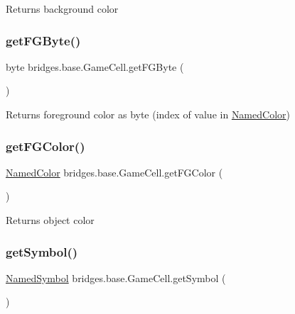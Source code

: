\begin{DoxyReturn}{Returns}
background color 
\end{DoxyReturn}
\mbox{\label{classbridges_1_1base_1_1_game_cell_ad1a05ce3e8ca8e148d867e6248023253}} 
\subsubsection{\texorpdfstring{getFGByte()}{getFGByte()}}
{\footnotesize\ttfamily byte bridges.\+base.\+Game\+Cell.\+get\+F\+G\+Byte (\begin{DoxyParamCaption}{ }\end{DoxyParamCaption})}

\begin{DoxyReturn}{Returns}
foreground color as byte (index of value in \mbox{\hyperlink{enumbridges_1_1base_1_1_named_color}{Named\+Color}}) 
\end{DoxyReturn}
\mbox{\label{classbridges_1_1base_1_1_game_cell_a9355404eb09017ca7ee3e90490e1d13b}} 
\subsubsection{\texorpdfstring{getFGColor()}{getFGColor()}}
{\footnotesize\ttfamily \mbox{\hyperlink{enumbridges_1_1base_1_1_named_color}{Named\+Color}} bridges.\+base.\+Game\+Cell.\+get\+F\+G\+Color (\begin{DoxyParamCaption}{ }\end{DoxyParamCaption})}

\begin{DoxyReturn}{Returns}
object color 
\end{DoxyReturn}
\mbox{\label{classbridges_1_1base_1_1_game_cell_a5c5ce5b363e442ac10c8588cbec77511}} 
\subsubsection{\texorpdfstring{getSymbol()}{getSymbol()}}
{\footnotesize\ttfamily \mbox{\hyperlink{enumbridges_1_1base_1_1_named_symbol}{Named\+Symbol}} bridges.\+base.\+Game\+Cell.\+get\+Symbol (\begin{DoxyParamCaption}{ }\end{DoxyParamCaption})}

